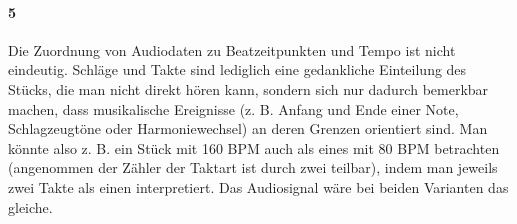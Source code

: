 {	\paragraph{5}  %
	{
		Die Zuordnung von Audiodaten zu Beatzeitpunkten und Tempo ist nicht eindeutig.
		Schläge und Takte sind lediglich eine gedankliche Einteilung des Stücks,
			die man nicht direkt hören kann,
			sondern sich nur dadurch bemerkbar machen,
			dass musikalische Ereignisse
			(z. B. Anfang und Ende einer Note, Schlagzeugtöne oder Harmoniewechsel)
			an deren Grenzen orientiert sind.
		Man könnte also z. B. ein Stück mit 160 BPM auch als eines mit 80 BPM betrachten
			(angenommen der Zähler der Taktart ist durch zwei teilbar),
			indem man jeweils zwei Takte als einen interpretiert.
		Das Audiosignal wäre bei beiden Varianten das gleiche.
	}


}
